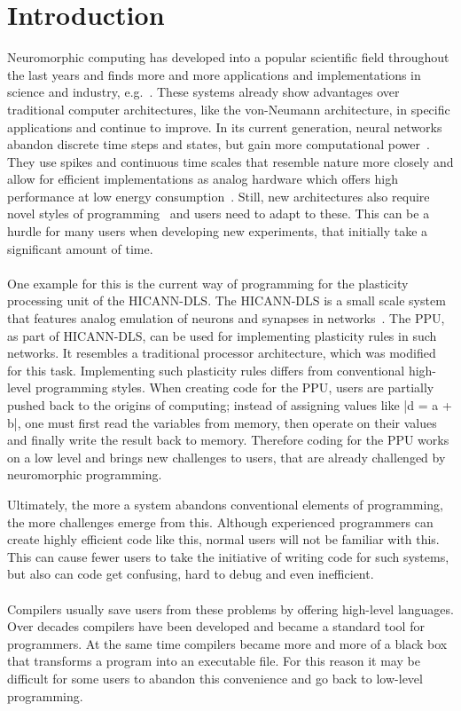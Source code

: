 \chapter{Introduction}
\label{chapter:introduction}

Neuromorphic computing has developed into a popular scientific field throughout the last years and finds more and more applications and implementations in science and industry, e.g.~\cite{6905473}.
These systems already show advantages over traditional computer architectures, like the von-Neumann architecture, in specific applications and continue to improve.
In its current generation, neural networks abandon discrete time steps and states, but gain more computational power~\cite{Maass19971659}.
They use spikes and continuous time scales that resemble nature more closely and allow for efficient implementations as analog hardware which offers high performance at low energy consumption~\cite{NIPS2015_5862}.
Still, new architectures also require novel styles of programming~\cite{Amir2013CognitiveCP} and users need to adapt to these.
This can be a hurdle for many users when developing new experiments, that initially take a significant amount of time. 
\\
\\
One example for this is the current way of programming for the plasticity processing unit of the \ac{HICANN-DLS}. 
The \ac{HICANN-DLS} is a small scale system that features analog emulation of neurons and synapses in networks~\cite{PPU}.
The \ac{PPU}, as part of \ac{HICANN-DLS}, can be used for implementing plasticity rules in such networks.
It resembles a traditional processor architecture, which was modified for this task.
Implementing such plasticity rules differs from conventional high-level programming styles. 
When creating code for the \ac{PPU}, users are partially pushed back to the origins of computing;
instead of assigning values like |d = a + b|, one must first read the variables from memory, then operate on their values and finally write the result back to memory.
Therefore coding for the \ac{PPU} works on a low level and brings new challenges to users, that are already challenged by neuromorphic programming.

Ultimately, the more a system abandons conventional elements of programming, the more challenges emerge from this.
Although experienced programmers can create highly efficient code like this, normal users will not be familiar with this.
This can cause fewer users to take the initiative of writing code for such systems, but also can code get confusing, hard to debug and even inefficient.
\\
\\
Compilers usually save users from these problems by offering high-level languages.
Over decades compilers have been developed and became a standard tool for programmers.
At the same time compilers became more and more of a black box that transforms a program into an executable file.
For this reason it may be difficult for some users to abandon this convenience and go back to low-level programming.

